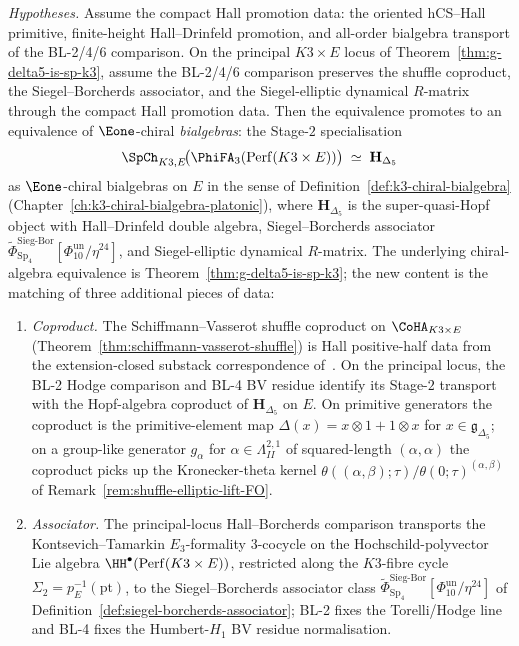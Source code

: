 \begin{theorem}
\label{thm:g-delta5-sp-k3-bialgebra}
\noindent\emph{Hypotheses.} Assume the compact Hall promotion data: the oriented hCS--Hall primitive, finite-height Hall--Drinfeld promotion, and all-order bialgebra transport of the BL-2/4/6 comparison.
On the principal $K3\times E$ locus of Theorem~\textup{\ref{thm:g-delta5-is-sp-k3}}, assume the BL-2/4/6 comparison preserves the shuffle coproduct, the Siegel--Borcherds associator, and the Siegel-elliptic dynamical $R$-matrix through the compact Hall promotion data. Then the equivalence promotes to an equivalence of $\Eone$-chiral \emph{bialgebras}: the Stage-$2$ specialisation
\[
 \SpCh_{K3, E}\!\bigl(\PhiFA_3(\mathrm{Perf}(K3 \times E))\bigr)
 \;\simeq\;
 \mathbf{H}_{\Delta_5}
\]
as $\Eone$-chiral bialgebras on $E$ in the sense of Definition~\textup{\ref{def:k3-chiral-bialgebra}} (Chapter~\textup{\ref{ch:k3-chiral-bialgebra-platonic}}), where $\mathbf{H}_{\Delta_5}$ is the super-quasi-Hopf object with Hall--Drinfeld double algebra, Siegel--Borcherds associator $\widetilde{\Phi}^{\mathrm{Sieg\text{-}Bor}}_{\mathrm{Sp}_4}[\Phi_{10}^{\mathrm{un}}/\eta^{24}]$, and Siegel-elliptic dynamical $R$-matrix. The underlying chiral-algebra equivalence is Theorem~\textup{\ref{thm:g-delta5-is-sp-k3}}; the new content is the matching of three additional pieces of data:
\begin{enumerate}[label=\textup{(B\arabic*)}]
 \item \label{bialg:coproduct} \emph{Coproduct.} The Schiffmann--Vasserot shuffle coproduct on $\CoHA_{K3 \times E}$ (Theorem~\textup{\ref{thm:schiffmann-vasserot-shuffle}}) is Hall positive-half data from the extension-closed substack correspondence of~\cite{KS2008}. On the principal locus, the BL-2 Hodge comparison and BL-4 BV residue identify its Stage-$2$ transport with the Hopf-algebra coproduct of $\mathbf{H}_{\Delta_5}$ on $E$. On primitive generators the coproduct is the primitive-element map $\Delta(x) = x \otimes 1 + 1 \otimes x$ for $x \in \mathfrak{g}_{\Delta_5}$; on a group-like generator $g_\alpha$ for $\alpha \in \Lambda^{2,1}_{II}$ of squared-length $(\alpha,\alpha)$ the coproduct picks up the Kronecker-theta kernel $\theta((\alpha,\beta);\tau)/\theta(0;\tau)^{(\alpha,\beta)}$ of Remark~\textup{\ref{rem:shuffle-elliptic-lift-FO}}.
 \item \label{bialg:associator} \emph{Associator.} The principal-locus Hall--Borcherds comparison transports the Kontsevich--Tamarkin $E_3$-formality $3$-cocycle on the Hochschild-polyvector Lie algebra $\HH^\bullet(\mathrm{Perf}(K3 \times E))$, restricted along the $K3$-fibre cycle $\Sigma_2 = p_E^{-1}(\mathrm{pt})$, to the Siegel--Borcherds associator class $\widetilde{\Phi}^{\mathrm{Sieg\text{-}Bor}}_{\mathrm{Sp}_4}[\Phi_{10}^{\mathrm{un}}/\eta^{24}]$ of Definition~\textup{\ref{def:siegel-borcherds-associator}}; BL-2 fixes the Torelli/Hodge line and BL-4 fixes the Humbert-$H_1$ BV residue normalisation.

\end{enumerate}
\end{theorem}
